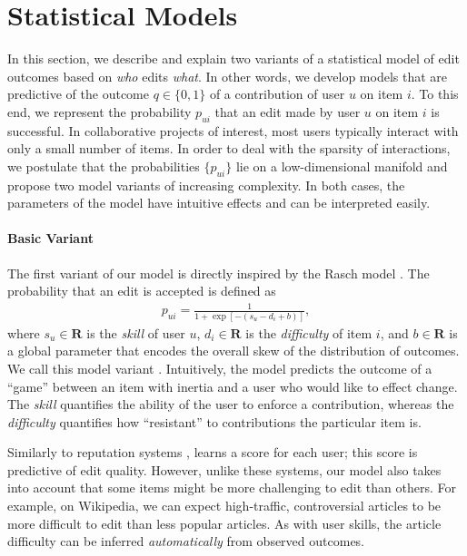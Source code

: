 \section{Statistical Models}
\label{pps:sec:models}

In this section, we describe and explain two variants of a statistical model of edit outcomes based on \emph{who} edits \emph{what}.
In other words, we develop models that are predictive of the outcome $q \in \{0, 1\}$ of a contribution of user $u$ on item $i$.
To this end, we represent the probability $p_{ui}$ that an edit made by user $u$ on item $i$ is successful.
In collaborative projects of interest, most users typically interact with only a small number of items.
In order to deal with the sparsity of interactions, we postulate that the probabilities $\{ p_{ui} \}$ lie on a low-dimensional manifold and propose two model variants of increasing complexity.
In both cases, the parameters of the model have intuitive effects and can be interpreted easily.

\paragraph{Basic Variant}
The first variant of our model is directly inspired by the Rasch model \citep{rasch1960probabilistic}.
The probability that an edit is accepted is defined as
\begin{align}
	\label{pps:eq:basicmodel}
	p_{ui} = \frac{1}{1 + \exp[-(s_u - d_i + b)]},
\end{align}
where $s_u\in\mathbf{R}$ is the \emph{skill} of user $u$, $d_i\in\mathbf{R}$ is the \emph{difficulty} of item $i$, and $b \in \mathbf{R}$ is a global parameter that encodes the overall skew of the distribution of outcomes.
We call this model variant .
Intuitively, the model predicts the outcome of a ``game'' between an item with inertia and a user who would like to effect change.
The \emph{skill} quantifies the ability of the user to enforce a contribution, whereas the \emph{difficulty} quantifies how ``resistant'' to contributions the particular item is.

Similarly to reputation systems \citep{adler2007content},  learns a score for each user; this score is predictive of edit quality.
However, unlike these systems, our model also takes into account that some items might be more challenging to edit than others.
For example, on Wikipedia, we can expect high-traffic, controversial articles to be more difficult to edit than less popular articles.
As with user skills, the article difficulty can be inferred \emph{automatically} from observed outcomes.

